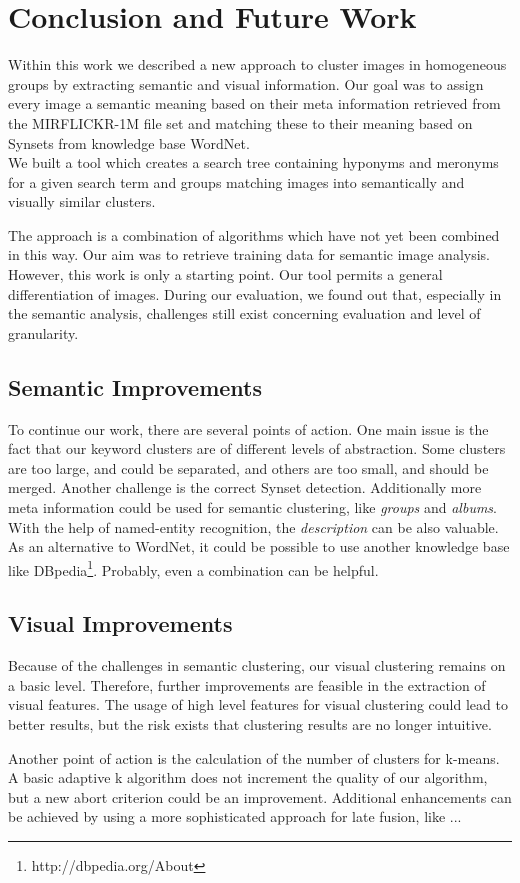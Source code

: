%
\section{Conclusion and Future Work}
\label{sec_future}
Within this work we described a new approach to cluster images in homogeneous groups by extracting semantic and visual information. Our goal was to assign every image a semantic meaning based on their meta information retrieved from the MIRFLICKR-1M file set and matching these to their meaning based on Synsets from knowledge base WordNet.\\ 
We built a tool which creates a search tree containing hyponyms  and meronyms for a given search term and groups matching images into semantically and visually similar clusters.

\bigskip
The approach is a combination of algorithms which have not yet been combined in this way. Our aim was to retrieve training data for semantic image analysis. However, this work is only a starting point. Our tool permits a general differentiation of images. During our evaluation, we found out that, especially in the semantic analysis, challenges still exist concerning evaluation and level of granularity.

\subsection{Semantic Improvements}
To continue our work, there are several points of action. One main issue is the fact that our keyword clusters are of different levels of abstraction. Some clusters are too large, and could be separated, and others are too small, and should be merged. Another challenge is the correct Synset detection. Additionally more meta information could be used for semantic clustering, like \emph{groups} and \emph{albums}. With the help of named-entity recognition, the \emph{description} can be also valuable. As an alternative to WordNet, it could be possible to use another knowledge base like DBpedia\footnote{http://dbpedia.org/About}. Probably, even a combination can be helpful.

\subsection{Visual Improvements}

Because of the challenges in semantic clustering, our visual clustering remains on a basic level. Therefore, further improvements are feasible in the extraction of visual features. The usage of high level features for visual clustering could lead to better results, but the risk exists that clustering results are no longer intuitive. 

Another point of action is the calculation of the number of clusters for k-means. A basic adaptive k algorithm does not increment the quality of our algorithm, but a new abort criterion could be an improvement. Additional enhancements can be achieved by using a more sophisticated approach for late fusion, like ...  